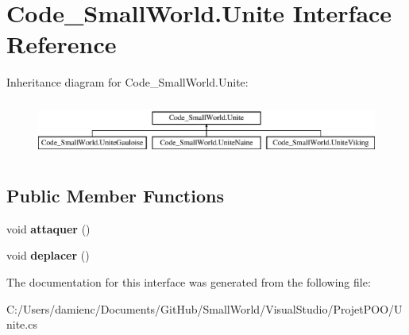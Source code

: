 \hypertarget{interface_code___small_world_1_1_unite}{\section{Code\-\_\-\-Small\-World.\-Unite Interface Reference}
\label{interface_code___small_world_1_1_unite}
}
Inheritance diagram for Code\-\_\-\-Small\-World.\-Unite\-:\begin{figure}[H]
\begin{center}
\leavevmode
\includegraphics[height=1.857380cm]{interface_code___small_world_1_1_unite}
\end{center}
\end{figure}
\subsection*{Public Member Functions}
\begin{DoxyCompactItemize}
\item 
\hypertarget{interface_code___small_world_1_1_unite_aca6d6724bda323a6d38b28f910e500aa}{void {\bfseries attaquer} ()}\label{interface_code___small_world_1_1_unite_aca6d6724bda323a6d38b28f910e500aa}

\item 
\hypertarget{interface_code___small_world_1_1_unite_ab2bcb3c1c951a555f72d48e7e554a125}{void {\bfseries deplacer} ()}\label{interface_code___small_world_1_1_unite_ab2bcb3c1c951a555f72d48e7e554a125}

\end{DoxyCompactItemize}


The documentation for this interface was generated from the following file\-:\begin{DoxyCompactItemize}
\item 
C\-:/\-Users/damienc/\-Documents/\-Git\-Hub/\-Small\-World/\-Visual\-Studio/\-Projet\-P\-O\-O/Unite.\-cs\end{DoxyCompactItemize}
